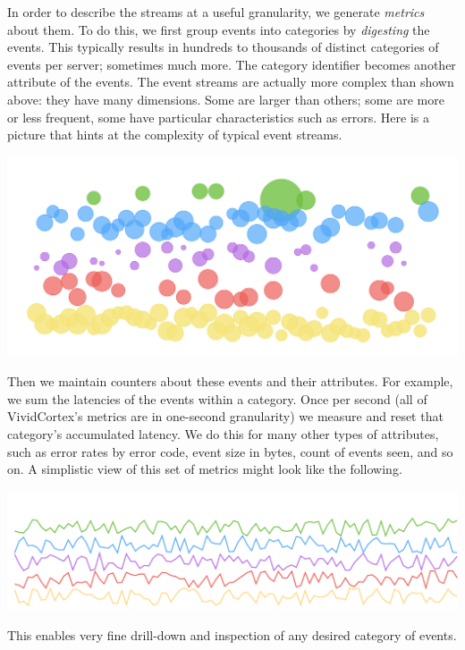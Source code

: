 \documentclass{vivid_layout}
\begin{document}
In order to describe the streams at a useful granularity, we generate
\emph{metrics} about them. To do this, we first group events into categories by
\emph{digesting} the events. This typically results in hundreds to thousands of
distinct categories of events per server; sometimes much more. The category
identifier becomes another attribute of the events. The event streams are
actually more complex than shown above: they have many dimensions. Some are
larger than others; some are more or less frequent, some have particular
characteristics such as errors. Here is a picture that hints at the complexity of
typical event streams.

\begin{center}
\includegraphics[width=.85\linewidth]{sketch-sampling/complex-event-stream}
\end{center}

Then we maintain counters about these events and their attributes. For example,
we sum the latencies of the events within a category. Once per second (all of
VividCortex's metrics are in one-second granularity) we measure and reset that
category's accumulated latency. We do this for many other types of attributes,
such as error rates by error code, event size in bytes, count of events seen,
and so on. A simplistic view of this set of metrics might look like the
following.

\begin{center}
\includegraphics[width=.85\linewidth]{sketch-sampling/complex-event-metrics}
\end{center}

This enables very fine drill-down and inspection of any desired category of
events.
\end{document}
